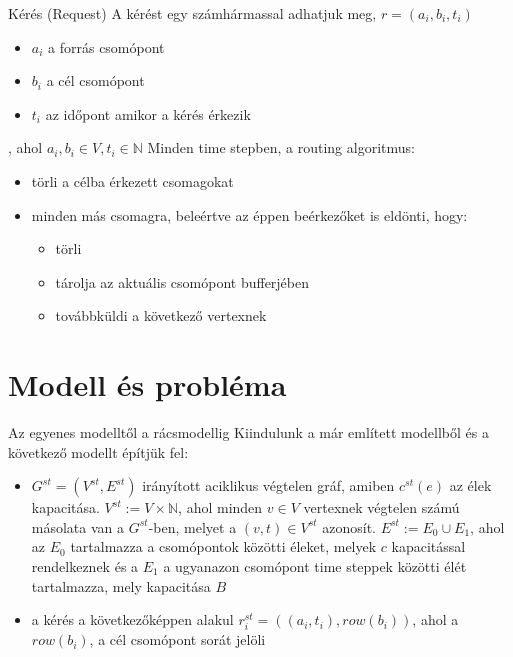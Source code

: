 \documentclass[10pt]{beamer}
\begin{document}
\begin{frame}{Kérés (Request)}
  A kérést egy számhármassal adhatjuk meg, $ r = \left(a_i, b_i, t_i \right)  $
  \begin{itemize}
  	\item $ a_i $ a forrás csomópont
  	\item $ b_i $ a cél csomópont
  	\item $ t_i $ az időpont amikor a kérés érkezik
  \end{itemize}
 , ahol $ a_i, b_i \in V, t_i \in \mathbb{N} $\newline
 Minden time stepben, a routing algoritmus:
 \begin{itemize}
 	\item törli a célba érkezett csomagokat
 	\item minden más csomagra, beleértve az éppen beérkezőket is eldönti, hogy:
	 \begin{itemize}
	 	\item törli
	 	\item tárolja az aktuális csomópont bufferjében
	 	\item továbbküldi a következő vertexnek
	 \end{itemize}
 \end{itemize}
\end{frame}

\section{Modell és probléma}

\begin{frame}{Az egyenes modelltől a rácsmodellig}
	Kiindulunk a már említett modellből és a következő modellt építjük fel:
	\begin{itemize}
		\item 
		$ G^{st} = \left( V^{st}, E^{st} \right) $ irányított aciklikus végtelen gráf, amiben $ c^{st}\left(e \right) $ az élek kapacitása. $ V^{st} := V \times \mathbb{N} $, ahol minden $ v \in V $ vertexnek végtelen számú másolata van a $ G^{st} $-ben, melyet a $ \left( v, t\right) \in V^{st} $ azonosít. $ E^{st} := E_0 \cup E_1 $, ahol az $ E_0 $ tartalmazza a csomópontok közötti éleket, melyek $ c $ kapacitással rendelkeznek és a $ E_1 $ a ugyanazon csomópont time steppek közötti élét tartalmazza, mely kapacitása $ B $
 		\item  a kérés a következőképpen alakul $ r_i^{st} = \left( \left( a_i, t_i\right) , row(b_i)\right) $, ahol a $ row(b_i) $, a cél csomópont sorát jelöli
	\end{itemize}
\end{frame}
\end{document}
